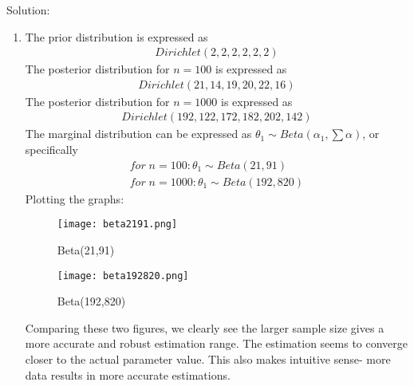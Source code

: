 \documentclass[final,11pt]{article}
\begin{document}
\begin{spacing}{1.25}
{\color{blue}
Solution:
\begin{enumerate}
    \item The prior distribution is expressed as
    \begin{gather}
        Dirichlet(2,2,2,2,2,2)
    \end{gather}
    The posterior distribution for $n=100$ is expressed as
    \begin{gather}
        Dirichlet(21,14,19,20,22,16)
    \end{gather}
    The posterior distribution for $n=1000$ is expressed as 
    \begin{gather}
        Dirichlet(192, 122, 172, 182, 202,142)
    \end{gather}
    The marginal distribution can be expressed as $\theta_1 \sim  Beta (\alpha_1, \sum \alpha)$, or specifically
    \begin{gather}
          for \; n=100: \theta_1 \sim Beta(21,91)\\ 
          for\; n = 1000: \theta_1 \sim Beta(192,820)
    \end{gather}
    Plotting the graphs:
\begin{figure}[H]
    \centering
    \texttt{[image: beta2191.png]}
    \caption{Beta(21,91)}
    \label{fig:enter-label}
\end{figure}
\begin{figure}[H]
    \centering
    \texttt{[image: beta192820.png]}
    \caption{Beta(192,820)}
    \label{fig:enter-label}
\end{figure}
Comparing these two figures, we clearly see the larger sample size gives a more accurate and robust estimation range. The estimation seems to converge closer to the actual parameter value. This also makes intuitive sense- more data results in more accurate estimations. 
\end{enumerate}
}

\end{spacing}
\end{document}
